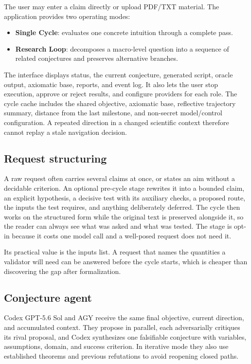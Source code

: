 \documentclass[11pt,a4paper]{article}
\begin{document}
The user may enter a claim directly or upload PDF/TXT material. The application provides two operating modes:

\begin{itemize}
  \item \textbf{Single Cycle}: evaluates one concrete intuition through a complete pass.
  \item \textbf{Research Loop}: decomposes a macro-level question into a sequence of related conjectures and preserves alternative branches.
\end{itemize}

The interface displays status, the current conjecture, generated script, oracle output, axiomatic base, reports, and event log. It also lets the user stop execution, approve or reject results, and configure providers for each role. The cycle cache includes the shared objective, axiomatic base, reflective trajectory summary, distance from the last milestone, and non-secret model/control configuration. A repeated direction in a changed scientific context therefore cannot replay a stale navigation decision.

\subsection{Request structuring}

A raw request often carries several claims at once, or states an aim without a decidable criterion. An optional pre-cycle stage rewrites it into a bounded claim, an explicit hypothesis, a decisive test with its auxiliary checks, a proposed route, the inputs the test requires, and anything deliberately deferred. The cycle then works on the structured form while the original text is preserved alongside it, so the reader can always see what was asked and what was tested. The stage is opt-in because it costs one model call and a well-posed request does not need it.

Its practical value is the inputs list. A request that names the quantities a validator will need can be answered before the cycle starts, which is cheaper than discovering the gap after formalization.

\subsection{Conjecture agent}

Codex GPT-5.6 Sol and AGY receive the same final objective, current direction, and accumulated context. They propose in parallel, each adversarially critiques its rival proposal, and Codex synthesizes one falsifiable conjecture with variables, assumptions, domain, and success criterion. In iterative mode they also use established theorems and previous refutations to avoid reopening closed paths.
\end{document}
